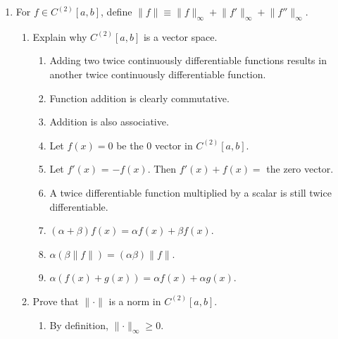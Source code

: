\documentclass{article}
\begin{document}
\begin{enumerate}
\begin{enumerate}
\begin{proof}
                        \end{proof}
                  \item Show that the set of sequences which are zero after
                        finitely many terms is dense in $c_o$.
                  \item Show that $c_o$ is not dense in $\ell_\infty$.
            \end{enumerate}
            \setcounter{enumi}{13}
      \item For $f\in C^{(2)}[a,b]$, define $\lVert f\rVert
                  \equiv\lVert f\rVert_\infty + \lVert f'\rVert_\infty
                  + \lVert f''\rVert_\infty$.
            \begin{enumerate}
                  \item Explain why $C^{(2)}[a,b]$ is a vector space.
                        \begin{enumerate}
                              \item Adding two twice continuously differentiable
                                    functions results in another twice continuously
                                    differentiable function.
                              \item Function addition is clearly commutative.
                              \item Addition is also associative.
                              \item Let $f(x)=0$ be the 0 vector in $C^{(2)}[a,b]$.
                              \item Let $f'(x)$ = $-f(x)$. Then $f'(x)+f(x)=$ the zero vector.
                              \item A twice differentiable function multiplied by a scalar is still twice differentiable.
                              \item $(\alpha+\beta)f(x) = \alpha f(x) + \beta f(x)$.
                              \item $\alpha(\beta \lVert f\rVert) = (\alpha\beta) \lVert f\rVert$.
                              \item $\alpha (f(x)+g(x)) = \alpha f(x) + \alpha g(x)$.
                        \end{enumerate}
                  \item Prove that $\lVert\cdot\rVert$ is a norm in
                        $C^{(2)}[a,b]$.
                        \begin{enumerate}
                              \item By definition, $\lVert\cdot\rVert_\infty\geq 0$.

\end{enumerate}
\end{enumerate}
\end{enumerate}
\end{document}
